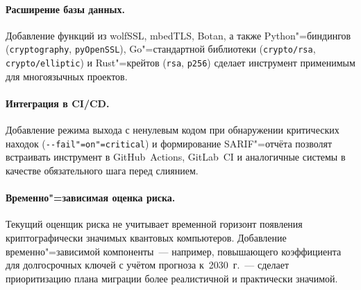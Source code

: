 \paragraph{Расширение базы данных.}
Добавление функций из wolfSSL, mbedTLS, Botan, а также
Python"=биндингов (\texttt{cryptography}, \texttt{pyOpenSSL}),
Go"=стандартной библиотеки (\texttt{crypto/rsa},
\texttt{crypto/elliptic}) и Rust"=крейтов (\texttt{rsa},
\texttt{p256}) сделает инструмент применимым для
многоязычных проектов.

\paragraph{Интеграция в CI/CD.}
Добавление режима выхода с ненулевым кодом при обнаружении
критических находок (\texttt{{-}{-}fail"=on"=critical}) и
формирование SARIF"=отчёта позволят встраивать инструмент
в GitHub~Actions, GitLab~CI и аналогичные системы в качестве
обязательного шага перед слиянием.

\paragraph{Временно"=зависимая оценка риска.}
Текущий оценщик риска не учитывает временной горизонт
появления криптографически значимых квантовых компьютеров.
Добавление временно"=зависимой компоненты~--- например, повышающего
коэффициента для долгосрочных ключей с учётом прогноза к~2030~г.~---
сделает приоритизацию плана миграции более реалистичной и
практически значимой.
